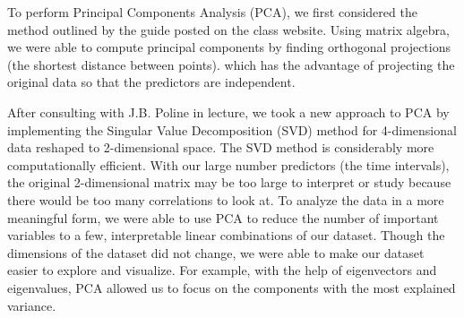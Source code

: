 \par \indent To perform Principal Components Analysis (PCA), we first considered the method outlined by the guide posted on the class website. Using matrix algebra, we were able to compute principal components by finding orthogonal projections (the shortest distance between points). which has the advantage of projecting the original data so that the predictors are independent. 
\par After consulting with J.B. Poline in lecture, we took a new approach to PCA by implementing the Singular Value Decomposition (SVD) method for 4-dimensional data reshaped to 2-dimensional space. The SVD method is considerably more computationally efficient. With our large number predictors (the time intervals), the original 2-dimensional matrix may be too large to interpret or study because there would be too many correlations to look at. To analyze the data in a more meaningful form, we were able to use PCA to reduce the number of important variables to a few, interpretable linear combinations of our dataset. Though the dimensions of the dataset did not change, we were able to make our dataset easier to explore and visualize. For example, with the help of eigenvectors and eigenvalues, PCA allowed us to focus on the components with the most explained variance. 
